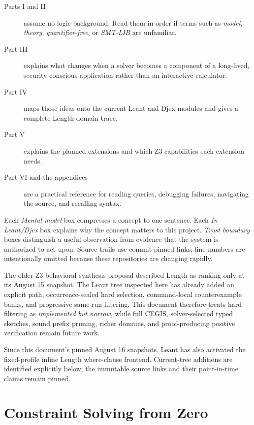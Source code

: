 \documentclass[10pt,letterpaper,oneside]{report}
\newcommand{\code}[1]{\texttt{\detokenize{#1}}}
\begin{document}
\begin{description}
\item[Parts I and II] assume no logic background. Read them in order if terms such as \emph{model}, \emph{theory}, \emph{quantifier-free}, or \emph{SMT-LIB} are unfamiliar.
\item[Part III] explains what changes when a solver becomes a component of a long-lived, security-conscious application rather than an interactive calculator.
\item[Part IV] maps those ideas onto the current Leant and Djex modules and gives a complete Length-domain trace.
\item[Part V] explains the planned extensions and which Z3 capabilities each extension needs.
\item[Part VI and the appendices] are a practical reference for reading queries, debugging failures, navigating the source, and recalling syntax.
\end{description}

Each \emph{Mental model} box compresses a concept to one sentence. Each \emph{In Leant/Djex} box explains why the concept matters to this project. \emph{Trust boundary} boxes distinguish a useful observation from evidence that the system is authorized to act upon. Source trails use commit-pinned links; line numbers are intentionally omitted because these repositories are changing rapidly.

\begin{currentstate}
The older Z3 behavioral-synthesis proposal described Length as ranking-only at its August 15 snapshot. The Leant tree inspected here has already added an explicit \code{--behavior-mode filter} path, occurrence-sealed hard selection, command-local counterexample banks, and progressive same-run filtering. This document therefore treats hard filtering as \emph{implemented but narrow}, while full CEGIS, solver-selected typed sketches, sound prefix pruning, richer domains, and proof-producing positive verification remain future work.

Since this document's pinned August 16 snapshots, Leant has also activated the
fixed-profile inline Length where-clause frontend. Current-tree additions are
identified explicitly below; the immutable source links and their
point-in-time claims remain pinned.
\end{currentstate}

\tableofcontents
\clearpage
{}

\part{Constraint Solving from Zero}
\end{document}
